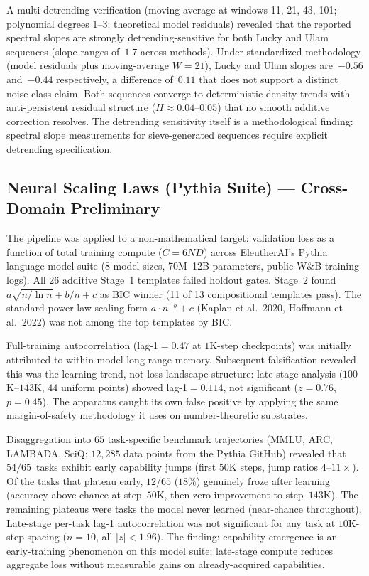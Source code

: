 \documentclass[12pt]{article}
\begin{document}
A multi-detrending verification (moving-average at windows 11, 21, 43, 101; polynomial degrees 1--3; theoretical model residuals) revealed that the reported spectral slopes are strongly detrending-sensitive for both Lucky and Ulam sequences (slope ranges of~$1.7$ across methods). Under standardized methodology (model residuals plus moving-average $W=21$), Lucky and Ulam slopes are~$-0.56$ and~$-0.44$ respectively, a difference of~$0.11$ that does not support a distinct noise-class claim. Both sequences converge to deterministic density trends with anti-persistent residual structure ($H \approx 0.04$--$0.05$) that no smooth additive correction resolves. The detrending sensitivity itself is a methodological finding: spectral slope measurements for sieve-generated sequences require explicit detrending specification.

\subsection{Neural Scaling Laws (Pythia Suite) --- Cross-Domain Preliminary}

The pipeline was applied to a non-mathematical target: validation loss as a function of total training compute ($C = 6ND$) across EleutherAI's Pythia language model suite (8 model sizes, 70M--12B parameters, public W\&B training logs). All 26 additive Stage~1 templates failed holdout gates. Stage~2 found $a\sqrt{n/\ln n} + b/n + c$ as BIC winner (11 of 13 compositional templates pass). The standard power-law scaling form $a \cdot n^{-b} + c$ (Kaplan et al.\ 2020, Hoffmann et al.\ 2022) was not among the top templates by BIC.

Full-training autocorrelation (lag-1$= 0.47$ at $1$K-step checkpoints) was initially attributed to within-model long-range memory. Subsequent falsification revealed this was the learning trend, not loss-landscape structure: late-stage analysis ($100$K--$143$K, $44$ uniform points) showed lag-1$= 0.114$, not significant ($z = 0.76$, $p = 0.45$). The apparatus caught its own false positive by applying the same margin-of-safety methodology it uses on number-theoretic substrates.

Disaggregation into $65$ task-specific benchmark trajectories (MMLU, ARC, LAMBADA, SciQ; $12{,}285$ data points from the Pythia GitHub) revealed that $54/65$~tasks exhibit early capability jumps (first $50$K steps, jump ratios $4$--$11\times$). Of the tasks that plateau early, $12/65$ ($18\%$) genuinely froze after learning (accuracy above chance at step~$50$K, then zero improvement to step~$143$K). The remaining plateaus were tasks the model never learned (near-chance throughout). Late-stage per-task lag-1 autocorrelation was not significant for any task at $10$K-step spacing ($n = 10$, all $|z| < 1.96$). The finding: capability emergence is an early-training phenomenon on this model suite; late-stage compute reduces aggregate loss without measurable gains on already-acquired capabilities.
\end{document}
